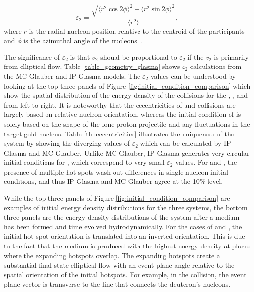 \begin{equation}
\label{eqn:eccentricity_equation}
\varepsilon_2 = \frac{\sqrt{\langle r^2 \cos2\phi\rangle^2+\langle r^2 \sin2\phi\rangle^2}}{\langle r^2\rangle},
\end{equation}
where $r$ is the radial nucleon position relative to the centroid of the participants and $\phi$ is the azimuthal angle of the nucleons~\cite{PhysRevC.81.054905}. 

The significance of $\varepsilon_2$ is that $v_2$ should be proportional to $\varepsilon_2$ if the $v_2$ is primarily from elliptical flow. Table \ref{table_geometry_glasma} shows $\varepsilon_2$ calculations from the MC-Glauber and IP-Glasma models. The $\varepsilon_2$ values can be understood by looking at the top three panels of Figure \ref{fig:initial_condition_comparison} which show the spatial distribution of the energy density of the collisions for the \pau, \dau, and \hau from left to right. It is noteworthy that the eccentricities of \dau and \hau collisions are largely based on relative nucleon orientation, whereas the initial condition of \pau is solely based on the shape of the lone proton projectile and any fluctuations in the target gold nucleus. Table \ref{tbl:eccentricities} illustrates the uniqueness of the \pau system by showing the diverging values of $\varepsilon_2$ which can be calculated by IP-Glasma and MC-Glauber. Unlike MC-Glauber, IP-Glasma generates very circular initial conditions for \pau, which correspond to very small $\varepsilon_2$ values. For \dau and \hau, the presence of multiple hot spots wash out differences in single nucleon initial conditions, and thus IP-Glasma and MC-Glauber agree at the 10\% level. 

While the top three panels of Figure \ref{fig:initial_condition_comparison} are examples of initial energy density distributions for the three systems, the bottom three panels are the energy density distributions of the system after a medium has been formed and time evolved hydrodynamically. For the cases of \dau and \hau, the initial hot spot orientation is translated into an inverted orientation. This is due to the fact that the medium is produced with the highest energy density at places where the expanding hotspots overlap. The expanding hotspots create a substantial final state elliptical flow with an event plane angle relative to the spatial orientation of the initial hotspots. For example, in the \dau collision, the event plane vector is transverse to the line that connects the deuteron's nucleons. 

